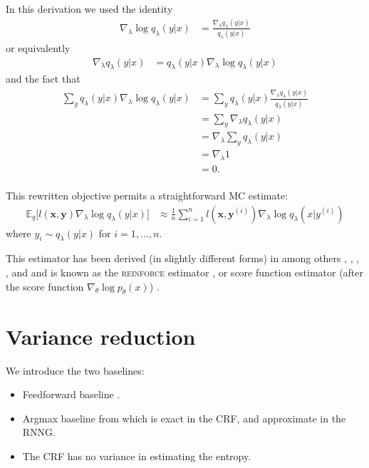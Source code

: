 In this derivation we used the identity
\begin{align*}
    \nabla_{\lambda}\log q_{\lambda}(y | x) &= \frac{\nabla_{\lambda} q_{\lambda}(y | x)}{q_{\lambda}(y | x)}
\end{align*}
or equivalently
\begin{align*}
    \nabla_{\lambda} q_{\lambda}(y | x) &= q_{\lambda}(y | x)\nabla_{\lambda}\log q_{\lambda}(y | x)
\end{align*}
and the fact that
\begin{subequations}
\begin{align*}
    \sum_{y} q_{\lambda}(y | x)\nabla_{\lambda}\log q_{\lambda}(y | x)
        &= \sum_{y}  q_{\lambda}(y | x) \frac{\nabla_{\lambda} q_{\lambda}(y | x)}{q_{\lambda}(y | x)}  \\
        &= \sum_{y} \nabla_{\lambda} q_{\lambda}(y | x) \\
        &= \nabla_{\lambda} \sum_{y} q_{\lambda}(y | x)\\
        &= \nabla_{\lambda} 1 \\
        &= 0. \\
\end{align*}
\end{subequations}

This rewritten objective permits a straightforward MC estimate:
\begin{align}
\label{eq:score-function-estimator}
    \mathbb{E}_{q} \big[ l(\mathbf{x}, \mathbf{y}) \nabla_{\lambda} \log q_{\lambda}(y | x) \big]
        &\approx \frac{1}{n}\sum_{i=1}^n  l(\mathbf{x}, \mathbf{y}^{(i)})\nabla_{\lambda} \log q_{\lambda}(x|y^{(i)})
\end{align}
where $y_i \sim q_{\lambda}(y | x)$ for $i=1,\dots,n$.

This estimator has been derived (in slightly different forms) in among others \citep{Williams1992:REINFORCE}, \citep{Paisley+2012:VISS}, \citep{Mnih+2014:NVIL}, \citep{Ranganath+2014:BBVI}, and \citep{Miao+2016} and is known as the \textsc{reinforce} estimator \citep{Williams1992:REINFORCE}, or score function estimator (after the score function $\nabla_{\theta} \log p_{\theta}(x)$) \citep{Fu2006}.

\section{Variance reduction}
We introduce the two baselines:
\begin{itemize}
  \item Feedforward baseline \citep{Miao+2016}.
  \item Argmax baseline from \citet{Rennie+2017:argmax-baseline} which is exact in the CRF, and approximate in the RNNG.
  \item The CRF has no variance in estimating the entropy.
\end{itemize}

